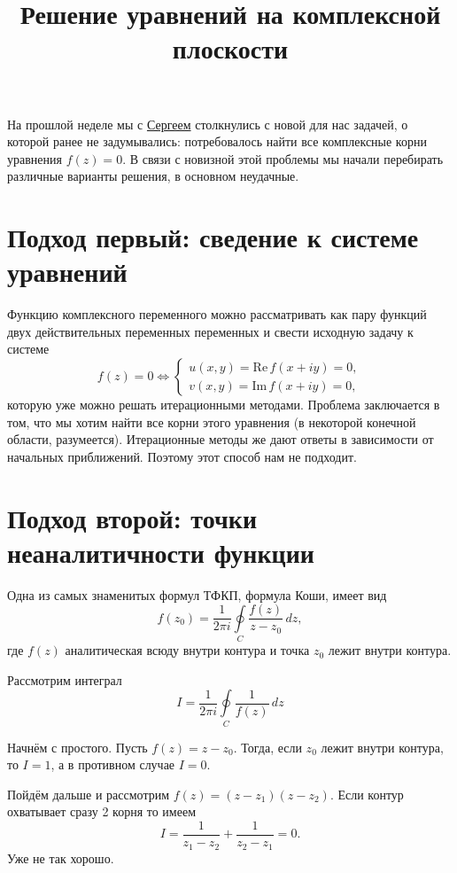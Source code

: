 

\title{Решение уравнений на комплексной плоскости}


\maketitle
\tableofcontents
На прошлой неделе мы с \href{https://github.com/sputnikas}{Сергеем} столкнулись с новой для нас задачей, о которой ранее
не задумывались: потребовалось найти все комплексные корни уравнения \( f(z) =
0 \). В связи с новизной этой проблемы мы начали перебирать различные варианты
решения, в основном неудачные.


\section{Подход первый: сведение к системе уравнений}

Функцию комплексного переменного можно рассматривать как пару функций двух
действительных переменных переменных и свести исходную задачу к системе
\[
    f(z) = 0 \Leftrightarrow
    \begin{cases}
    u(x,y) = \mathrm{Re\,} f(x+iy) = 0,\\
    v(x,y) = \mathrm{Im\,} f(x+iy) = 0,
    \end{cases}
\]
которую уже можно решать итерационными методами. Проблема заключается в том, что
мы хотим найти все корни этого уравнения (в некоторой конечной области,
разумеется). Итерационные методы же дают ответы в зависимости от начальных
приближений. Поэтому этот способ нам не подходит.

\section{Подход второй: точки неаналитичности функции}

Одна из самых знаменитых формул ТФКП, формула Коши, имеет вид
\[
    f(z_0) = \frac{1}{2\pi i}\oint\limits_{C} \frac{f(z)}{z-z_0}\,dz,
\]
где \(f(z)\) аналитическая всюду внутри контура и точка \(z_0\) лежит внутри
контура.

Рассмотрим интеграл
\[
    I = \frac{1}{2\pi i}\oint\limits_{C} \frac{1}{f(z)}\,dz
\]

Начнём с простого. Пусть \( f(z) = z - z_0 \). Тогда, если  \( z_0 \) лежит внутри контура, то \(I = 1\), а в противном случае \(I=0\).

Пойдём дальше и рассмотрим \(f(z) = (z-z_1)(z-z_2)\). Если контур охватывает сразу 2 корня то имеем
\[
I = \frac{1}{z_1 - z_2} + \frac{1}{z_2 - z_1} = 0.
\]
Уже не так хорошо.

